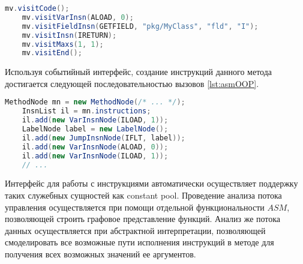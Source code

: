 \begin{lstlisting}[language=Java, caption=Пример использования событийного интерфейса., label=lst:asmVisitor]
    mv.visitCode();
    mv.visitVarInsn(ALOAD, 0);
    mv.visitFieldInsn(GETFIELD, "pkg/MyClass", "fld", "I");
    mv.visitInsn(IRETURN);
    mv.visitMaxs(1, 1);
    mv.visitEnd();
\end{lstlisting}

Используя событийный интерфейс, создание инструкций данного метода достигается следующей последовательностью вызовов \autoref{lst:asmOOP}.

\begin{lstlisting}[language=Java, caption=Пример использования объектно-ориентированного интерфейса., label=lst:asmOOP]
    MethodNode mn = new MethodNode(/* ... */);
    InsnList il = mn.instructions;
    il.add(new VarInsnNode(ILOAD, 1));
    LabelNode label = new LabelNode();
    il.add(new JumpInsnNode(IFLT, label));
    il.add(new VarInsnNode(ALOAD, 0));
    il.add(new VarInsnNode(ILOAD, 1));
    // ...
\end{lstlisting}

Интерфейс для работы с инструкциями автоматически осуществляет поддержку таких служебных сущностей как constant pool. Проведение анализа потока управления осуществляется при помощи отдельной функциональности $ASM$, позволяющей строить графовое представление функций. Анализ же потока данных осуществляется при абстрактной интерпретации, позволяющей смоделировать все возможные пути исполнения инструкций в методе для получения всех возможных значений ее аргументов.

\newpage
